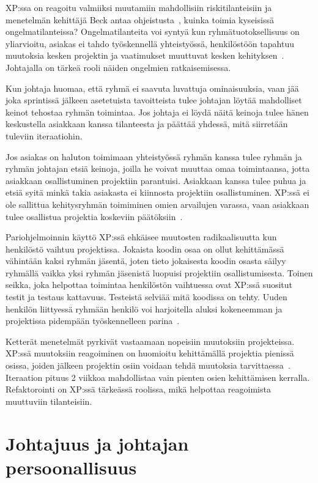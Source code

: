 \documentclass[finnish]{tktltiki2}
\theoremstyle{definition}
\theoremstyle{remark}
\begin{document}
XP:ssa on reagoitu valmiiksi muutamiin mahdollisiin riskitilanteisiin ja menetelmän kehittäjä Beck antaa ohjeistusta~\cite{796139}, kuinka toimia kyseisissä ongelmatilanteissa? Ongelmatilanteita voi syntyä kun ryhmätuotoksellisuus on yliarvioitu, asiakas ei tahdo työskennellä yhteistyössä, henkilöstöön tapahtuu muutoksia kesken projektin ja vaatimukset muuttuvat kesken kehityksen~\cite{796139}. Johtajalla on tärkeä rooli näiden ongelmien ratkaisemisessa.

Kun johtaja huomaa, että ryhmä ei saavuta luvattuja ominaisuuksia, vaan jää joka sprintissä jälkeen asetetuista tavoitteista tulee johtajan löytää mahdolliset keinot tehostaa ryhmän toimintaa. Jos johtaja ei löydä näitä keinoja tulee hänen keskustella asiakkaan kanssa tilanteesta ja päättää yhdessä, mitä siirretään tuleviin iteraatiohin.

Jos asiakas on haluton toimimaan yhteistyössä ryhmän kanssa tulee ryhmän ja ryhmän johtajan etsiä keinoja, joilla he voivat muuttaa omaa toimintaansa, jotta asiakkaan osallistuminen projektiin parantuisi. Asiakkaan kanssa tulee puhua ja etsiä syitä minkä takia asiakasta ei kiinnosta projektiin osallistuminen. XP:ssä ei ole sallittua kehitysryhmän toimiminen omien arvailujen varassa, vaan asiakkaan tulee osallistua projektia koskeviin päätöksiin~\cite{796139}.

Pariohjelmoinnin käyttö XP:ssä ehkäisee muutosten radikaalisuutta kun henkilöstö vaihtuu projektissa. Jokaista koodin osaa on ollut kehittämässä vähintään kaksi ryhmän jäsentä, joten tieto jokaisesta koodin osasta säilyy ryhmällä vaikka yksi ryhmän jäsenistä luopuisi projektiin osallistumisesta. Toinen seikka, joka helpottaa toimintaa henkilöstön vaihtuessa ovat XP:ssä suositut testit ja testaus kattavuus. Testeistä selviää mitä koodissa on tehty. Uuden henkilön liittyessä ryhmään henkilö voi harjoitella aluksi kokeneemman ja projektissa pidempään työskennelleen parina~\cite{796139}.

Ketterät menetelmät pyrkivät vastaamaan nopeisiin muutoksiin projekteissa. XP:ssä muutoksiin reagoiminen on huomioitu kehittämällä projektia pienissä osissa, joiden jälkeen projektin osiin voidaan tehdä muutoksia tarvittaessa~\cite{796139}. Iteraation pituus 2 viikkoa mahdollistaa vain pienten osien kehittämisen kerralla. Refaktorointi on XP:ssä tärkeässä roolissa, mikä helpottaa reagoimista muuttuviin tilanteisiin.

 

\section{Johtajuus ja johtajan persoonallisuus}
\end{document}

